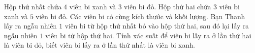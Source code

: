 \begin{bt}%
	Hộp thứ nhất chứa $4$ viên bi xanh và $3$ viên bi đỏ. Hộp thứ hai chứa $3$ viên bi xanh và $5$ viên bi đỏ. Các viên bi có cùng kích thước và khối lượng. Bạn Thanh lấy ra ngẫu nhiên $1$ viên bi từ hộp thứ nhất bỏ vào hộp thứ hai, sau đó lại lấy ra ngẫu nhiên $1$ viên bi từ hộp thứ hai. Tính xác suất để viên bi lấy ra ở lần thứ hai là viên bi đỏ, biết viên bi lấy ra ở lần thứ nhất là viên bi xanh.
\end{bt}


